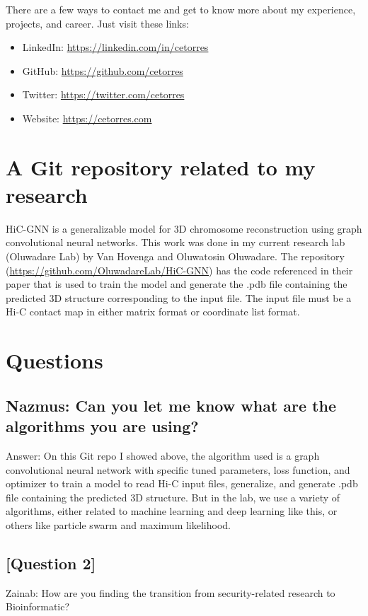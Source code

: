 There are a few ways to contact me and get to know more about my experience, projects, and career. Just visit these links:
\begin{itemize}
    \item LinkedIn: \url{https://linkedin.com/in/cetorres}
    \item GitHub: \url{https://github.com/cetorres}
    \item Twitter: \url{https://twitter.com/cetorres}
    \item Website: \url{https://cetorres.com}
\end{itemize}

\section{A Git repository related to my research}

HiC-GNN is a generalizable model for 3D chromosome reconstruction using graph convolutional neural networks. This work was done in my current research lab (Oluwadare Lab) by Van Hovenga and Oluwatosin Oluwadare. The repository (\url{https://github.com/OluwadareLab/HiC-GNN}) has the code referenced in their paper that is used to train the model and generate the .pdb file containing the predicted 3D structure corresponding to the input file. The input file must be a Hi-C contact map in either matrix format or coordinate list format.


\section{Questions}

\subsection{Nazmus: Can you let me know what are the algorithms you are using?}
Answer: On this Git repo I showed above, the algorithm used is a graph convolutional neural network with specific tuned parameters, loss function, and optimizer to train a model to read Hi-C input files, generalize, and generate .pdb file containing the predicted 3D structure. But in the lab, we use a variety of algorithms, either related to machine learning and deep learning like this, or others like particle swarm and maximum likelihood.

\subsection{[Question 2]}


Zainab: How are you finding the transition from security-related research to Bioinformatic? 

% 

